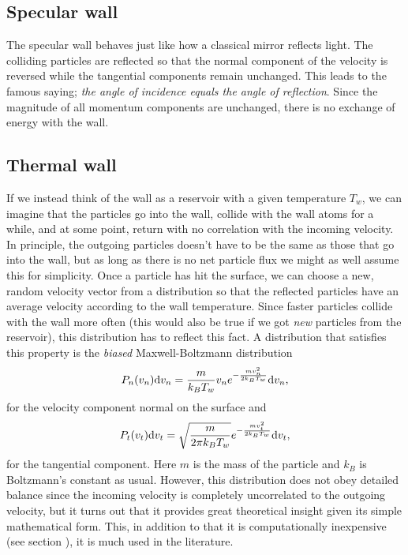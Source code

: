 \subsection{Specular wall}
The specular wall behaves just like how a classical mirror reflects light. The colliding particles are reflected so that the normal component of the velocity is reversed while the tangential components remain unchanged. This leads to the famous saying; \textit{the angle of incidence equals the angle of reflection}. Since the magnitude of all momentum components are unchanged, there is no exchange of energy with the wall. 

\subsection{Thermal wall}
If we instead think of the wall as a reservoir with a given temperature $T_w$, we can imagine that the particles go into the wall, collide with the wall atoms for a while, and at some point, return with no correlation with the incoming velocity. In principle, the outgoing particles doesn't have to be the same as those that go into the wall, but as long as there is no net particle flux we might as well assume this for simplicity. Once a particle has hit the surface, we can choose a new, random velocity vector from a distribution so that the reflected particles have an average velocity according to the wall temperature. Since faster particles collide with the wall more often (this would also be true if we got \textit{new} particles from the reservoir), this distribution has to reflect this fact. A distribution that satisfies this property is the \textit{biased} Maxwell-Boltzmann distribution\cite{alexander1997direct} 
\begin{align}
	P_n(v_n)\mathrm{d}v_n = {m\over k_BT_w}v_n e^{-\frac{mv_n^2}{2k_BT_w}} \mathrm{d}v_n,
\end{align}
for the velocity component normal on the surface and
\begin{align}
	P_t(v_t)\mathrm{d}v_t = \sqrt{m\over 2\pi k_BT_w}e^{-\frac{mv_t^2}{2k_BT_w}} \mathrm{d}v_t,
\end{align}
for the tangential component. Here $m$ is the mass of the particle and $k_B$ is Boltzmann's constant as usual. However, this distribution does not obey detailed balance since the incoming velocity is completely uncorrelated to the outgoing velocity, but it turns out that it provides great theoretical insight given its simple mathematical form. This, in addition to that it is computationally inexpensive (see section ), it is much used in the literature. 
